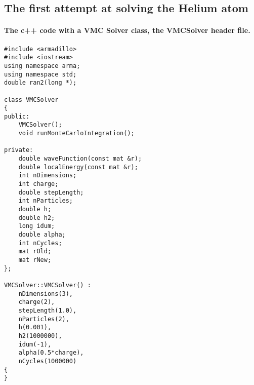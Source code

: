\documentclass[%
twoside,                 %
final,                   %
10pt]{article}
\begin{document}
\subsection*{The first attempt at solving the Helium atom}

\paragraph{The c++ code with a VMC Solver class, the VMCSolver header file.}

\begin{verbatim}
#include <armadillo>
#include <iostream>
using namespace arma;
using namespace std;
double ran2(long *);

class VMCSolver
{
public:
    VMCSolver();
    void runMonteCarloIntegration();

private:
    double waveFunction(const mat &r);
    double localEnergy(const mat &r);
    int nDimensions;
    int charge;
    double stepLength;
    int nParticles;
    double h;
    double h2;
    long idum;
    double alpha;
    int nCycles;
    mat rOld;
    mat rNew;
};

VMCSolver::VMCSolver() :
    nDimensions(3),
    charge(2),
    stepLength(1.0),
    nParticles(2),
    h(0.001),
    h2(1000000),
    idum(-1),
    alpha(0.5*charge),
    nCycles(1000000)
{
}


\end{verbatim}
\end{document}
